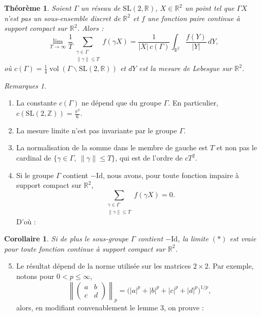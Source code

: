 \documentclass[11pt]{article}
\newtheorem{theoreme}{Théorème}
\newtheorem{corollaire}{Corollaire}
\theoremstyle{remark}
\newtheorem*{remarques}{Remarques}
\newcommand{\R}{\mathbb{R}}
\newcommand{\Z}{\mathbb{Z}}
\newcommand{\SL}{\mathrm{SL}}
\newcommand{\Id}{\mathrm{Id}}
\newcommand{\vol}{\operatorname{vol}}
\begin{document}
\begin{theoreme}
Soient $\Gamma$ un réseau de $\SL(2,\R)$, $X\in\R^2$ un point tel que $\Gamma X$ n'est pas un sous-ensemble discret de $\R^2$ et $f$ une fonction paire continue à support compact sur $\R^2$. Alors :
\begin{equation}\tag{$*$}
\lim_{T\to\infty}\frac{1}{T}\sum_{\substack{\gamma\in\Gamma\\ \|\gamma\|\le T}} f(\gamma X)
=\frac{1}{|X|\,c(\Gamma)}\int_{\R^2}\frac{f(Y)}{|Y|}\,dY,
\end{equation}
où $c(\Gamma)=\frac14\vol(\Gamma\backslash\SL(2,\R))$ et $dY$ est la mesure de Lebesgue sur $\R^2$.
\end{theoreme}

\begin{remarques}
\begin{enumerate}
\item La constante $c(\Gamma)$ ne dépend que du groupe $\Gamma$. En particulier,
$c(\SL(2,\Z))=\frac{\pi^2}{6}$.
\item La mesure limite n'est pas invariante par le groupe $\Gamma$.
\item La normalisation de la somme dans le membre de gauche est $T$ et non pas le cardinal de
$\{\gamma\in\Gamma,\ \|\gamma\|\le T\}$, qui est de l'ordre de $cT^2$.
\item Si le groupe $\Gamma$ contient $-\Id$, nous avons, pour toute fonction impaire à support compact sur $\R^2$,
\[
\sum_{\substack{\gamma\in\Gamma\\ \|\gamma\|\le T}} f(\gamma X)=0.
\]
D'où :
\end{enumerate}
\end{remarques}

\begin{corollaire}
Si de plus le sous-groupe $\Gamma$ contient $-\Id$, la limite $(*)$ est vraie pour toute fonction continue à support compact sur $\R^2$.
\end{corollaire}

\begin{enumerate}
\setcounter{enumi}{4}
\item Le résultat dépend de la norme utilisée sur les matrices $2\times2$. Par exemple, notons pour $0<p\le\infty$,
\[
\left\|\begin{pmatrix}a&b\\ c&d\end{pmatrix}\right\|_p
=\bigl(|a|^p+|b|^p+|c|^p+|d|^p\bigr)^{1/p},
\]
alors, en modifiant convenablement le lemme 3, on prouve :
\end{enumerate}
\end{document}
